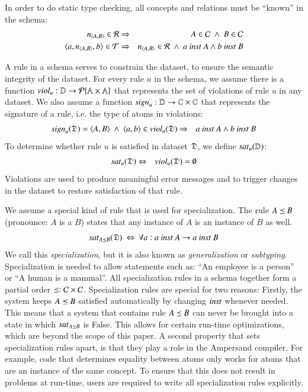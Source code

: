 \documentclass{elsarticle}
\begin{document}
   In order to do static type checking,
   all concepts and relations must be ``known'' in the schema:
\begin{eqnarray}
   \declare{n}{A}{B}\in\rels&\Rightarrow&A\in\concepts\ \wedge\ B\in\concepts
   \label{eqn:relationsIntroduceConcepts}\\
   \triple{a}{\declare{n}{A}{B}}{b}\in\triples&\Rightarrow&\declare{n}{A}{B}\in\rels\ \wedge\ a\ \inst\ A\wedge b\ \inst\ B
   \label{eqn:define R}
\end{eqnarray}

   A rule in a schema serves to constrain the dataset,
   to ensure the semantic integrity of the dataset.
   For every rule $u$ in the schema, we assume there is a function $\text{\it viol\/}_u : \mathbb{D}\rightarrow\cal{P}\{\mathbb{A}\times\mathbb{A}\}$
   that represents the set of violations of rule $u$ in any dataset.
   We also assume a function $\text{\it sign\/}_{u} : \mathbb{D}\rightarrow\mathbb{C}\times\mathbb{C}$
   that represents the signature of a rule, i.e. the type of atoms in violations:
\begin{eqnarray}
   \sign{u}{\dataset}=\pair{A}{B}\ \wedge\ \pair{a}{b}\in\viol{u}{\dataset}&\Rightarrow&a\ \inst\ A\wedge b\ \inst\ B
   \label{eqn:typed violations}
\end{eqnarray}
   To determine whether rule $u$ is satisfied in dataset $\mathfrak{D}$,
   we define $\text{\it sat\/}_{u}(\mathbb{D})$:
\begin{eqnarray}
   \text{\it sat\/}_{u}(\mathfrak{D})&\Leftrightarrow&\text{\it viol\/}_{u}(\mathfrak{D})=\emptyset
   \label{eqn:sat}
\end{eqnarray}
   Violations are used to produce meaningful error messages and to trigger changes in the dataset to restore satisfaction of that rule.

   We assume a special kind of rule that is used for specialization.
   The rule $A\preceq B$ (pronounce: $A$ is a $B$) states that any instance of $A$ is an instance of $B$ as well.
\begin{equation}
   \label{eqn:specialization}
   \sat{A\isa B}{\dataset}\ \Leftrightarrow\ \forall a: a\ \inst\ A\rightarrow a\ \inst\ B
\end{equation}
   We call this {\em specialization}, but it is also known as {\em generalization} or {\em subtyping}.
   Specialization is needed to allow statements such as: ``An employee is a person'' or ``A human is a mammal''.
   All specialization rules in a schema together form a partial order $\preceq : \mathcal{C}\times\mathcal{C}$.
   Specialization rules are special for two reasons:
   Firstly, the system keeps $A\preceq B$ satisfied automatically by changing $\text{\it inst\/}$ whenever needed.
   This means that a system that contains rule $A\preceq B$ can never be brought into a state in which $\text{\it sat\/}_{A\preceq B}$ is False.
   This allows for certain run-time optimizations, which are beyond the scope of this paper.
   A second property that sets specialization rules apart, is that they play a role in the Ampersand compiler.
   For example, code that determines equality between atoms only works for atoms that are an instance of the same concept.
   To ensure that this does not result in problems at run-time, users are required to write all specialization rules explicitly.
\end{document}
